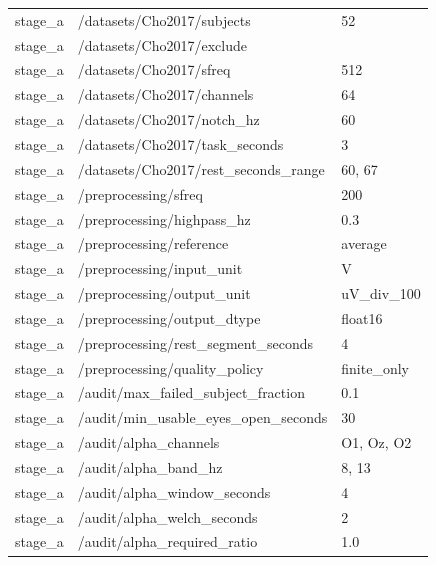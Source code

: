 \begin{longtable}{p{.65in}p{2.8in}p{3.2in}}
stage\_\allowbreak{}a & /datasets/Cho2017/subjects & 52 \\
stage\_\allowbreak{}a & /datasets/Cho2017/exclude &  \\
stage\_\allowbreak{}a & /datasets/Cho2017/sfreq & 512 \\
stage\_\allowbreak{}a & /datasets/Cho2017/channels & 64 \\
stage\_\allowbreak{}a & /datasets/Cho2017/notch\_\allowbreak{}hz & 60 \\
stage\_\allowbreak{}a & /datasets/Cho2017/task\_\allowbreak{}seconds & 3 \\
stage\_\allowbreak{}a & /datasets/Cho2017/rest\_\allowbreak{}seconds\_\allowbreak{}range & 60, 67 \\
stage\_\allowbreak{}a & /preprocessing/sfreq & 200 \\
stage\_\allowbreak{}a & /preprocessing/highpass\_\allowbreak{}hz & 0.3 \\
stage\_\allowbreak{}a & /preprocessing/reference & average \\
stage\_\allowbreak{}a & /preprocessing/input\_\allowbreak{}unit & V \\
stage\_\allowbreak{}a & /preprocessing/output\_\allowbreak{}unit & uV\_\allowbreak{}div\_\allowbreak{}100 \\
stage\_\allowbreak{}a & /preprocessing/output\_\allowbreak{}dtype & float16 \\
stage\_\allowbreak{}a & /preprocessing/rest\_\allowbreak{}segment\_\allowbreak{}seconds & 4 \\
stage\_\allowbreak{}a & /preprocessing/quality\_\allowbreak{}policy & finite\_\allowbreak{}only \\
stage\_\allowbreak{}a & /audit/max\_\allowbreak{}failed\_\allowbreak{}subject\_\allowbreak{}fraction & 0.1 \\
stage\_\allowbreak{}a & /audit/min\_\allowbreak{}usable\_\allowbreak{}eyes\_\allowbreak{}open\_\allowbreak{}seconds & 30 \\
stage\_\allowbreak{}a & /audit/alpha\_\allowbreak{}channels & O1, Oz, O2 \\
stage\_\allowbreak{}a & /audit/alpha\_\allowbreak{}band\_\allowbreak{}hz & 8, 13 \\
stage\_\allowbreak{}a & /audit/alpha\_\allowbreak{}window\_\allowbreak{}seconds & 4 \\
stage\_\allowbreak{}a & /audit/alpha\_\allowbreak{}welch\_\allowbreak{}seconds & 2 \\
stage\_\allowbreak{}a & /audit/alpha\_\allowbreak{}required\_\allowbreak{}ratio & 1.0 \\

\end{longtable}
